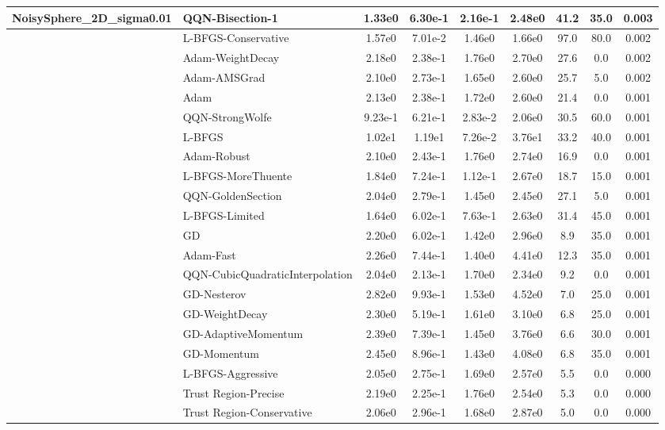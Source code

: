 \documentclass[10pt]{article}
\begin{document}
\begin{longtable}{|l|l|c|c|c|c|c|c|c|}
NoisySphere\_2D\_sigma0.01 & \textbf{QQN-Bisection-1} & 1.33e0 & 6.30e-1 & 2.16e-1 & 2.48e0 & 41.2 & 35.0 & 0.003 \\
\hline
 & L-BFGS-Conservative & 1.57e0 & 7.01e-2 & 1.46e0 & 1.66e0 & 97.0 & 80.0 & 0.002 \\
\hline
 & Adam-WeightDecay & 2.18e0 & 2.38e-1 & 1.76e0 & 2.70e0 & 27.6 & 0.0 & 0.002 \\
\hline
 & Adam-AMSGrad & 2.10e0 & 2.73e-1 & 1.65e0 & 2.60e0 & 25.7 & 5.0 & 0.002 \\
\hline
 & Adam & 2.13e0 & 2.38e-1 & 1.72e0 & 2.60e0 & 21.4 & 0.0 & 0.001 \\
\hline
 & QQN-StrongWolfe & 9.23e-1 & 6.21e-1 & 2.83e-2 & 2.06e0 & 30.5 & 60.0 & 0.001 \\
\hline
 & L-BFGS & 1.02e1 & 1.19e1 & 7.26e-2 & 3.76e1 & 33.2 & 40.0 & 0.001 \\
\hline
 & Adam-Robust & 2.10e0 & 2.43e-1 & 1.76e0 & 2.74e0 & 16.9 & 0.0 & 0.001 \\
\hline
 & L-BFGS-MoreThuente & 1.84e0 & 7.24e-1 & 1.12e-1 & 2.67e0 & 18.7 & 15.0 & 0.001 \\
\hline
 & QQN-GoldenSection & 2.04e0 & 2.79e-1 & 1.45e0 & 2.45e0 & 27.1 & 5.0 & 0.001 \\
\hline
 & L-BFGS-Limited & 1.64e0 & 6.02e-1 & 7.63e-1 & 2.63e0 & 31.4 & 45.0 & 0.001 \\
\hline
 & GD & 2.20e0 & 6.02e-1 & 1.42e0 & 2.96e0 & 8.9 & 35.0 & 0.001 \\
\hline
 & Adam-Fast & 2.26e0 & 7.44e-1 & 1.40e0 & 4.41e0 & 12.3 & 35.0 & 0.001 \\
\hline
 & QQN-CubicQuadraticInterpolation & 2.04e0 & 2.13e-1 & 1.70e0 & 2.34e0 & 9.2 & 0.0 & 0.001 \\
\hline
 & GD-Nesterov & 2.82e0 & 9.93e-1 & 1.53e0 & 4.52e0 & 7.0 & 25.0 & 0.001 \\
\hline
 & GD-WeightDecay & 2.30e0 & 5.19e-1 & 1.61e0 & 3.10e0 & 6.8 & 25.0 & 0.001 \\
\hline
 & GD-AdaptiveMomentum & 2.39e0 & 7.39e-1 & 1.45e0 & 3.76e0 & 6.6 & 30.0 & 0.001 \\
\hline
 & GD-Momentum & 2.45e0 & 8.96e-1 & 1.43e0 & 4.08e0 & 6.8 & 35.0 & 0.001 \\
\hline
 & L-BFGS-Aggressive & 2.05e0 & 2.75e-1 & 1.69e0 & 2.57e0 & 5.5 & 0.0 & 0.000 \\
\hline
 & Trust Region-Precise & 2.19e0 & 2.25e-1 & 1.76e0 & 2.54e0 & 5.3 & 0.0 & 0.000 \\
\hline
 & Trust Region-Conservative & 2.06e0 & 2.96e-1 & 1.68e0 & 2.87e0 & 5.0 & 0.0 & 0.000 \\

\end{longtable}
\end{document}
